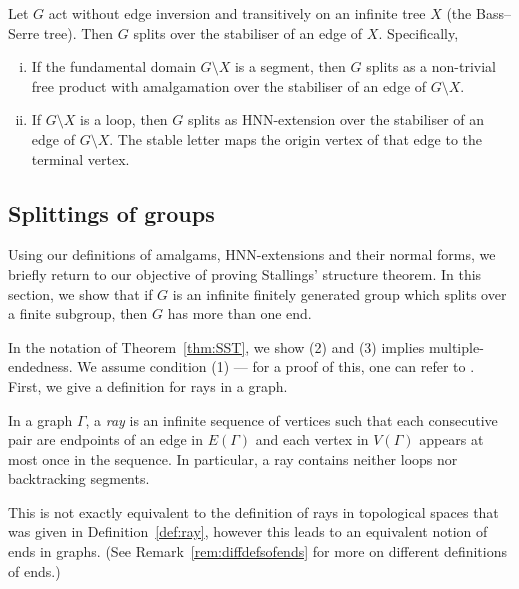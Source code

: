\begin{theorem}
\label{thm:bassserre}
     Let \(G\) act without edge inversion and transitively on an infinite tree \(X\) (the Bass--Serre tree). Then \(G\) splits over the stabiliser of an edge of \(X\). Specifically,
\begin{enumerate}[(i)]
    \item If the fundamental domain \(G \setminus X\) is a segment, then \(G\) splits as a non-trivial free product with amalgamation over the stabiliser of an edge of \(G \setminus X\). 
    \item If \(G \setminus X\) is a loop, then \(G\) splits as HNN-extension over the stabiliser of an edge of \(G \setminus X\). The stable letter maps the origin vertex of that edge to the terminal vertex.
\end{enumerate}
\end{theorem}

\subsection{Splittings of groups}
  Using our definitions of amalgams, HNN-extensions and their normal forms, we briefly return to our objective of proving Stallings' structure theorem. In this section, we show that if \(G\) is an infinite finitely generated group which splits over a finite subgroup, then \(G\) has more than one end. 
  
  In the notation of Theorem~\ref{thm:SST}, we show (2) and (3) implies multiple-endedness. We assume condition (1) --- for a proof of this, one can refer to \cite[Chapter 11.6, Corollary 11.34]{M08}. First, we give a definition for rays in a graph.

\begin{definition}
    In a graph \(\Gamma\), a \emph{ray} is an infinite sequence of vertices such that each consecutive pair are endpoints of an edge in \(E(\Gamma)\) and each vertex in \(V(\Gamma)\) appears at most once in the sequence. In particular, a ray contains neither loops nor backtracking segments.
\end{definition}

\begin{caveat}
    This is not exactly equivalent to the definition of rays in topological spaces that was given in Definition~\ref{def:ray}, however this leads to an equivalent notion of ends in graphs. (See Remark~\ref{rem:diffdefsofends} for more on different definitions of ends.)
\end{caveat}
  
